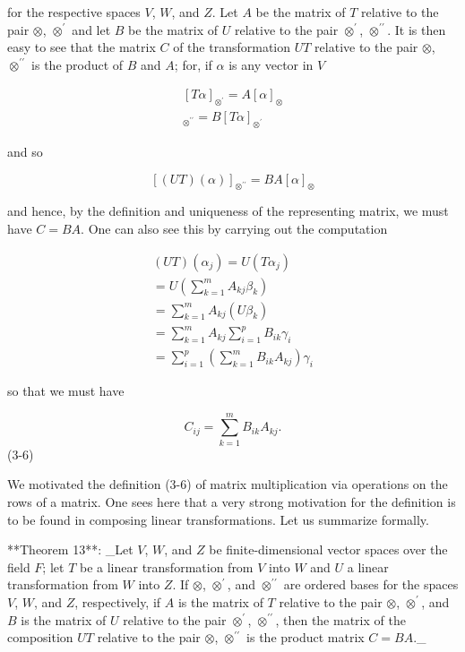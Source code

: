 for the respective spaces \(V\), \(W\), and \(Z\). Let \(A\) be the matrix of \(T\) relative to the pair \(\otimes\), \(\otimes^{\prime}\) and let \(B\) be the matrix of \(U\) relative to the pair \(\otimes^{\prime}\), \(\otimes^{\prime\prime}\). It is then easy to see that the matrix \(C\) of the transformation \(UT\) relative to the pair \(\otimes\), \(\otimes^{\prime\prime}\) is the product of \(B\) and \(A\); for, if \(\alpha\) is any vector in \(V\)

\[\begin{array}{c}[T\alpha]_{\otimes^{\prime}}=A[\alpha]_{\otimes}\\ [U(T\alpha)]_{\otimes^{\prime\prime}}=B[T\alpha]_{\otimes^{\prime}}\end{array}\]

and so

\[[(UT)(\alpha)]_{\otimes^{\prime\prime}}=BA[\alpha]_{\otimes}\]

and hence, by the definition and uniqueness of the representing matrix, we must have \(C=BA\). One can also see this by carrying out the computation

\[\begin{array}{c}(UT)(\alpha_{j})=U(T\alpha_{j})\\ =U\left(\sum\limits_{k=1}^{m}A_{kj}\beta_{k}\right)\\ =\sum\limits_{k=1}^{m}A_{kj}(U\beta_{k})\\ =\sum\limits_{k=1}^{m}A_{kj}\sum\limits_{i=1}^{p}B_{ik}\gamma_{i}\\ =\sum\limits_{i=1}^{p}\left(\sum\limits_{k=1}^{m}B_{ik}A_{kj}\right)\gamma_{i} \end{array}\]

so that we must have

\[C_{ij}=\sum\limits_{k=1}^{m}B_{ik}A_{kj}.\] (3-6)

We motivated the definition (3-6) of matrix multiplication via operations on the rows of a matrix. One sees here that a very strong motivation for the definition is to be found in composing linear transformations. Let us summarize formally.

**Theorem 13**: _Let \(V\), \(W\), and \(Z\) be finite-dimensional vector spaces over the field \(F\); let \(T\) be a linear transformation from \(V\) into \(W\) and \(U\) a linear transformation from \(W\) into \(Z\). If \(\otimes\), \(\otimes^{\prime}\), and \(\otimes^{\prime\prime}\) are ordered bases for the spaces \(V\), \(W\), and \(Z\), respectively, if \(A\) is the matrix of \(T\) relative to the pair \(\otimes\), \(\otimes^{\prime}\), and \(B\) is the matrix of \(U\) relative to the pair \(\otimes^{\prime}\), \(\otimes^{\prime\prime}\), then the matrix of the composition \(UT\) relative to the pair \(\otimes\), \(\otimes^{\prime\prime}\) is the product matrix \(C=BA\)._

